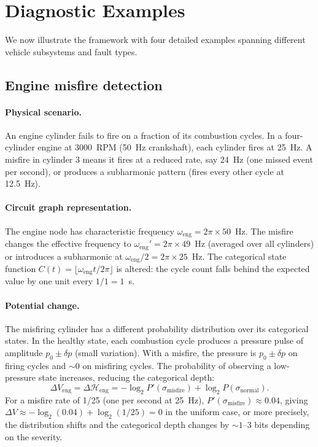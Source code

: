\documentclass[twocolumn,10pt,a4paper]{article}
\theoremstyle{definition}
\theoremstyle{remark}
\begin{document}
\section{Diagnostic Examples}\label{sec:examples}

We now illustrate the framework with four detailed examples spanning different vehicle subsystems and fault types.

\subsection{Engine misfire detection}\label{sec:misfire}

\paragraph{Physical scenario.} An engine cylinder fails to fire on a fraction of its combustion cycles. In a four-cylinder engine at 3000~RPM (50~Hz crankshaft), each cylinder fires at 25~Hz. A misfire in cylinder 3 means it fires at a reduced rate, say 24~Hz (one missed event per second), or produces a subharmonic pattern (fires every other cycle at 12.5~Hz).

\paragraph{Circuit graph representation.} The engine node has characteristic frequency $\omega_{\mathrm{eng}} = 2\pi \times 50$~Hz. The misfire changes the effective frequency to $\omega_{\mathrm{eng}}' = 2\pi \times 49$~Hz (averaged over all cylinders) or introduces a subharmonic at $\omega_{\mathrm{eng}}/2 = 2\pi \times 25$~Hz. The categorical state function $C(t) = \lfloor \omega_{\mathrm{eng}} t / 2\pi \rfloor$ is altered: the cycle count falls behind the expected value by one unit every $1/1 = 1$~s.

\paragraph{Potential change.} The misfiring cylinder has a different probability distribution over its categorical states. In the healthy state, each combustion cycle produces a pressure pulse of amplitude $p_0 \pm \delta p$ (small variation). With a misfire, the pressure is $p_0 \pm \delta p$ on firing cycles and $\sim 0$ on misfiring cycles. The probability of observing a low-pressure state increases, reducing the categorical depth:
\begin{equation}
\Delta V_{\mathrm{eng}} = \Delta \mathcal{H}_{\mathrm{eng}} = -\log_2 P'(\sigma_{\mathrm{misfire}}) + \log_2 P(\sigma_{\mathrm{normal}}).
\end{equation}
For a misfire rate of 1/25 (one per second at 25~Hz), $P'(\sigma_{\mathrm{misfire}}) \approx 0.04$, giving $\Delta V \approx -\log_2(0.04) + \log_2(1/25) = 0$ in the uniform case, or more precisely, the distribution shifts and the categorical depth changes by $\sim 1$--$3$ bits depending on the severity.
\end{document}
